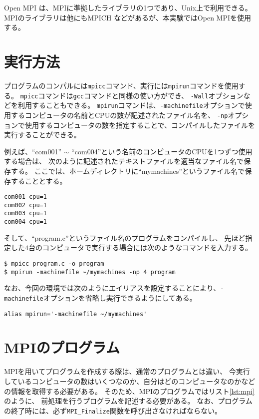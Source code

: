\documentclass[a4j,titlepage]{jsarticle}
\begin{document}
Open MPI \cite{bib:1} は、MPIに準拠したライブラリの1つであり、Unix上で利用できる。
MPIのライブラリは他にもMPICH \cite{bib:2} などがあるが、本実験ではOpen MPIを使用する。


\section{実行方法}
プログラムのコンパルには\texttt{mpicc}コマンド、実行には\texttt{mpirun}コマンドを使用する。
\texttt{mpicc}コマンドは\texttt{gcc}コマンドと同様の使い方ができ、
\texttt{-Wall}オプションなどを利用することもできる。
\texttt{mpirun}コマンドは、\texttt{-machinefile}オプションで使用するコンピュータの名前とCPUの数が記述されたファイル名を、
\texttt{-np}オプションで使用するコンピュータの数を指定することで、コンパイルしたファイルを実行することができる。

例えば、``com001'' $\sim$ ``com004''という名前のコンピュータのCPUを1つずつ使用する場合は、
次のように記述されたテキストファイルを適当なファイル名で保存する。
ここでは、ホームディレクトリに``mymachines''というファイル名で保存することとする。

\begin{lstlisting}[style=text]
com001 cpu=1
com002 cpu=1
com003 cpu=1
com004 cpu=1
\end{lstlisting}

そして、``program.c''というファイル名のプログラムをコンパイルし、
先ほど指定した$4$台のコンピュータで実行する場合には次のようなコマンドを入力する。

\begin{lstlisting}[style=text]
$ mpicc program.c -o program
$ mpirun -machinefile ~/mymachines -np 4 program
\end{lstlisting}

なお、今回の環境では次のようにエイリアスを設定することにより、\texttt{-machinefile}オプションを省略し実行できるようにしてある。

\begin{lstlisting}[style=text]
alias mpirun='-machinefile ~/mymachines'
\end{lstlisting}


\section{MPIのプログラム}
MPIを用いてプログラムを作成する際は、通常のプログラムとは違い、
今実行しているコンピュータの数はいくつなのか、自分はどのコンピュータなのかなどの情報を取得する必要がある。
そのため、MPIのプログラムではリスト\ref{lst:mpi}のように、
前処理を行うプログラムを記述する必要がある。
なお、プログラムの終了時には、必ず\texttt{MPI\_Finalize}関数を呼び出さなければならない。
\end{document}

